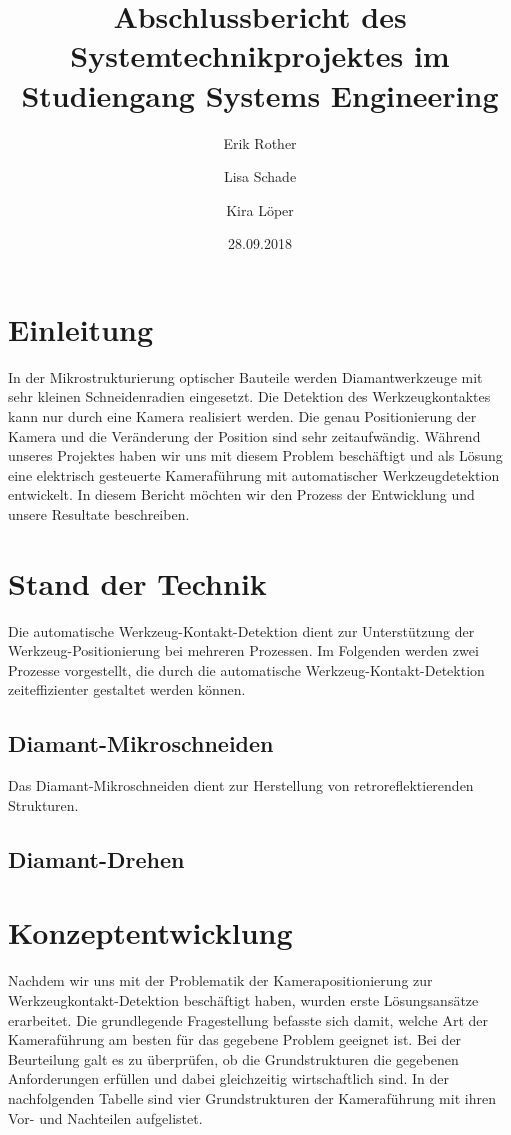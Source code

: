 \documentclass[a4paper]{report}
\title{Abschlussbericht des Systemtechnikprojektes im Studiengang Systems Engineering}
\author{
  Erik Rother\\
  \and
  Lisa Schade\\
  \and
  Kira Löper\\
}
\date{28.09.2018}
\begin{document}
\maketitle

\tableofcontents

\chapter{Einleitung}
In der Mikrostrukturierung optischer Bauteile werden Diamantwerkzeuge mit sehr kleinen Schneidenradien eingesetzt. Die Detektion des Werkzeugkontaktes kann nur durch eine Kamera realisiert werden. Die genau Positionierung der Kamera und die Veränderung der Position sind sehr zeitaufwändig. Während unseres Projektes haben wir uns mit diesem Problem beschäftigt und als Lösung eine elektrisch gesteuerte Kameraführung mit automatischer Werkzeugdetektion entwickelt. In diesem Bericht möchten wir den Prozess der Entwicklung und unsere Resultate beschreiben. 

\chapter{Stand der Technik}
Die automatische Werkzeug-Kontakt-Detektion dient zur Unterstützung der Werkzeug-Positionierung bei mehreren Prozessen. Im Folgenden werden zwei Prozesse vorgestellt, die durch die automatische Werkzeug-Kontakt-Detektion zeiteffizienter gestaltet werden können. 

\section{Diamant-Mikroschneiden}
Das Diamant-Mikroschneiden dient zur Herstellung von retroreflektierenden Strukturen. 

\section{Diamant-Drehen}

\chapter{Konzeptentwicklung}

Nachdem wir uns mit der Problematik der Kamerapositionierung zur Werkzeugkontakt-Detektion beschäftigt haben, wurden erste Lösungsansätze erarbeitet. Die grundlegende Fragestellung befasste sich damit, welche Art der Kameraführung am besten für das gegebene Problem geeignet ist. Bei der Beurteilung galt es zu überprüfen, ob die Grundstrukturen die gegebenen Anforderungen erfüllen und dabei gleichzeitig wirtschaftlich sind. In der nachfolgenden Tabelle sind vier Grundstrukturen der Kameraführung mit ihren Vor- und Nachteilen aufgelistet. \\ \\
\end{document}
